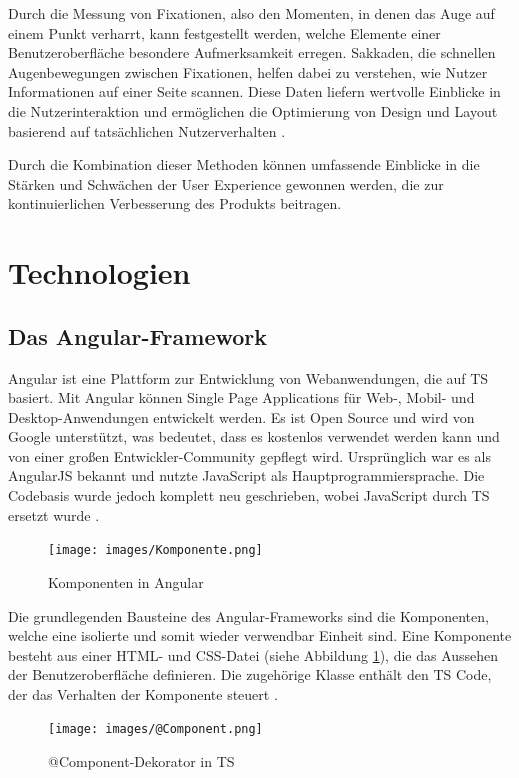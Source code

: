 Durch die Messung von Fixationen, also den Momenten, in denen das Auge auf einem Punkt verharrt, kann festgestellt werden, welche Elemente einer Benutzeroberfläche besondere Aufmerksamkeit erregen. 
Sakkaden, die schnellen Augenbewegungen zwischen Fixationen, helfen dabei zu verstehen, wie Nutzer Informationen auf einer Seite scannen. 
Diese Daten liefern wertvolle Einblicke in die Nutzerinteraktion und ermöglichen die Optimierung von Design und Layout basierend auf tatsächlichen Nutzerverhalten \cite[S.3 ff.]{eye_tracking}.
  
Durch die Kombination dieser Methoden können umfassende Einblicke in die Stärken und Schwächen der User Experience gewonnen werden, die zur kontinuierlichen Verbesserung des Produkts beitragen.

\section{Technologien}

\subsection{Das Angular-Framework}
Angular ist eine Plattform zur Entwicklung von Webanwendungen, die auf \ac{TS} basiert. 
Mit Angular können Single Page Applications für Web-, Mobil- und Desktop-Anwendungen entwickelt werden. 
Es ist Open Source und wird von Google unterstützt, was bedeutet, dass es kostenlos verwendet werden kann und von einer großen Entwickler-Community gepflegt wird. 
Ursprünglich war es als AngularJS bekannt und nutzte JavaScript als Hauptprogrammiersprache. Die Codebasis wurde jedoch komplett neu geschrieben, wobei JavaScript durch TS ersetzt wurde \cite{angular_arch}.

\begin{figure}[h]
    \centering
    \texttt{[image: images/Komponente.png]}
    \caption[Komponenten in Angular]{Komponenten in Angular}
    \label{KomponentenAngular}
\end{figure}

Die grundlegenden Bausteine des Angular-Frameworks sind die Komponenten, welche eine isolierte und somit wieder verwendbar Einheit sind. 
Eine Komponente besteht aus einer HTML- und CSS-Datei (siehe Abbildung \ref{KomponentenAngular}), die das Aussehen der Benutzeroberfläche definieren. Die zugehörige Klasse enthält den TS Code, der das Verhalten der Komponente steuert \cite{angular_arch}.

\begin{figure}[h]
    \centering
    \texttt{[image: images/@Component.png]}
    \caption[@Component-Dekorator in TypeScript]{@Component-Dekorator in TS}
    \label{Component}
\end{figure}

